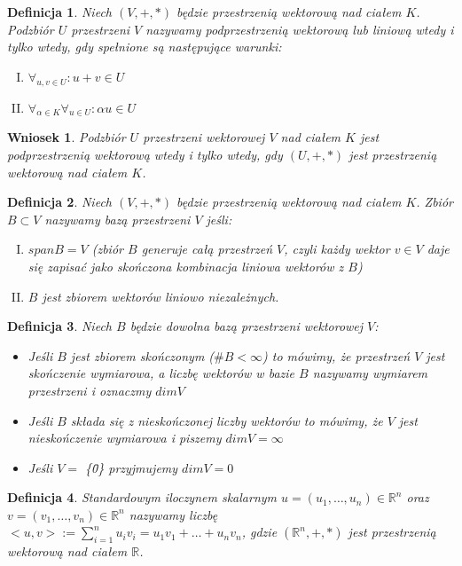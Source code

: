 \documentclass[12pt,a4paper]{article}
\newtheorem{df}{Definicja}[section]
\newtheorem{wn}{Wniosek}[section]
\begin{document}
\begin{df}
Niech $(V, +, *)$ b\k{e}dzie przestrzeni\k{a} wektorow\k{a} nad cia{\l}em $K$. Podzbi\'or $U$ przestrzeni $V$ nazywamy podprzestrzeni\k{a} wektorow\k{a} lub liniow\k{a} wtedy i tylko wtedy, gdy spe{\l}nione s\k{a} nast\k{e}puj\k{a}ce warunki:
\begin{enumerate}[I.]
\item $\forall_{u,v\in U}: u+v\in U$ 
\item $\forall_{\alpha\in K}\forall_{u\in U}: \alpha u\in U$
\end{enumerate}
\end{df}
\begin{wn}
Podzbi\'or $U$ przestrzeni wektorowej $V$ nad cia{\l}em $K$ jest podprzestrzeni\k{a} wektorow\k{a} wtedy i tylko wtedy, gdy $(U, +, *)$ jest przestrzeni\k{a} wektorow\k{a} nad cia{\l}em $K$.
\end{wn}
\begin{df}
Niech $(V, +, *)$ b\k{e}dzie przestrzeni\k{a} wektorow\k{a} nad cia{\l}em $K$. Zbi\'{o}r $B \subset V$ nazywamy baz\k{a} przestrzeni $V$ je\'{s}li:
\begin{enumerate}[I.]
\item $span B = V$ (zbi\'{o}r $B$ generuje ca{\l}\k{a} przestrze\'{n} $V$, czyli ka\.{z}dy wektor $v \in V$ daje si\k{e} zapisa\'{c} jako sko\'{n}czona kombinacja liniowa wektor\'{o}w z $B$)
\item $B$ jest zbiorem wektor\'{o}w liniowo niezale\.{z}nych.
\end{enumerate}
\end{df}
\begin{df}
Niech $B$ b\k{e}dzie dowolna baz\k{a} przestrzeni wektorowej $V$:
\begin{itemize}
\item Je\'{s}li $B$ jest zbiorem sko\'{n}czonym ($\#B<\infty$) to m\'{o}wimy, \.{z}e przestrze\'{n} $V$ jest sko\'{n}czenie wymiarowa, a liczb\k{e} wektor\'{o}w w bazie $B$ nazywamy wymiarem przestrzeni i oznaczmy $dim V$
\item Je\'{s}li $B$ sk{\l}ada si\k{e} z niesko\'{n}czonej liczby wektor\'{o}w to m\'{o}wimy, \.{z}e $V$ jest niesko\'{n}czenie wymiarowa i piszemy $dim V = \infty$
\item Je\'{s}li $V =$ \{\={0}\} przyjmujemy $dim V = 0$
\end{itemize}
\end{df}
\begin{df}
Standardowym iloczynem skalarnym $u = (u_{1}, \dots, u_{n}) \in \mathbb{R}^{n}$ oraz $v = (v_{1}, \dots, v_{n}) \in \mathbb{R}^{n}$ nazywamy liczb\k{e} $<u, v> := \sum_{i=1}^{n} u_{i}v_{i} = u_{1}v_{1} + \dots + u_{n}v_{n}$, gdzie $(\mathbb{R}^{n},+,*)$ jest przestrzeni\k{a} wektorow\k{a} nad cia{\l}em $\mathbb{R}$.
\end{df}
\end{document}
